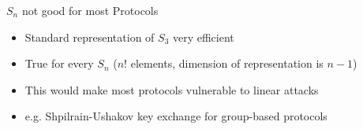 \begin{frame}{$S_n$ not good for most Protocols}
    \large
    \begin{itemize}
        \item Standard representation of $S_3$ very efficient \pause
        \item True for every $S_n$ ($n!$ elements, dimension of representation is $n - 1$) \pause
        \item This would make most protocols vulnerable to linear attacks
        \item e.g. Shpilrain-Ushakov key exchange for group-based protocols
    \end{itemize}

    \vspace{1em}
    {\hspace*{\fill} \cite{khovanov2022monoidal}}
\end{frame}
